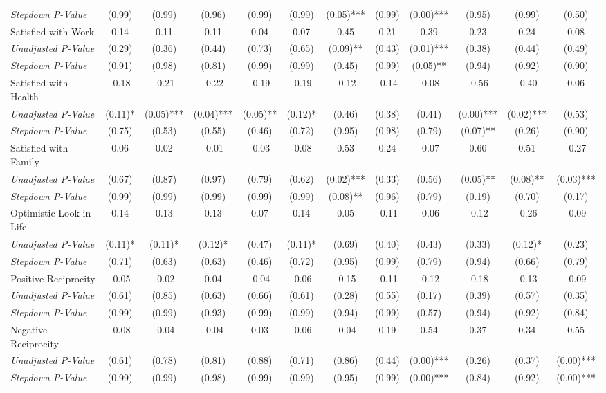 \begin{tabular}{l c c c c c c c c c c c}
\quad \textit{Stepdown P-Value} & (0.99) & (0.99) & (0.96) & (0.99) & (0.99) & (0.05)*** & (0.99) & (0.00)*** & (0.95) & (0.99) & (0.50) \\
Satisfied with Work & 0.14 & 0.11 & 0.11 & 0.04 & 0.07 & 0.45 & 0.21 & 0.39 & 0.23 & 0.24 & 0.08 \\
\quad \textit{Unadjusted P-Value} & (0.29) & (0.36) & (0.44) & (0.73) & (0.65) & (0.09)** & (0.43) & (0.01)*** & (0.38) & (0.44) & (0.49) \\
\quad \textit{Stepdown P-Value} & (0.91) & (0.98) & (0.81) & (0.99) & (0.99) & (0.45) & (0.99) & (0.05)** & (0.94) & (0.92) & (0.90) \\
Satisfied with Health & -0.18 & -0.21 & -0.22 & -0.19 & -0.19 & -0.12 & -0.14 & -0.08 & -0.56 & -0.40 & 0.06 \\
\quad \textit{Unadjusted P-Value} & (0.11)* & (0.05)*** & (0.04)*** & (0.05)** & (0.12)* & (0.46) & (0.38) & (0.41) & (0.00)*** & (0.02)*** & (0.53) \\
\quad \textit{Stepdown P-Value} & (0.75) & (0.53) & (0.55) & (0.46) & (0.72) & (0.95) & (0.98) & (0.79) & (0.07)** & (0.26) & (0.90) \\
Satisfied with Family & 0.06 & 0.02 & -0.01 & -0.03 & -0.08 & 0.53 & 0.24 & -0.07 & 0.60 & 0.51 & -0.27 \\
\quad \textit{Unadjusted P-Value} & (0.67) & (0.87) & (0.97) & (0.79) & (0.62) & (0.02)*** & (0.33) & (0.56) & (0.05)** & (0.08)** & (0.03)*** \\
\quad \textit{Stepdown P-Value} & (0.99) & (0.99) & (0.99) & (0.99) & (0.99) & (0.08)** & (0.96) & (0.79) & (0.19) & (0.70) & (0.17) \\
Optimistic Look in Life & 0.14 & 0.13 & 0.13 & 0.07 & 0.14 & 0.05 & -0.11 & -0.06 & -0.12 & -0.26 & -0.09 \\
\quad \textit{Unadjusted P-Value} & (0.11)* & (0.11)* & (0.12)* & (0.47) & (0.11)* & (0.69) & (0.40) & (0.43) & (0.33) & (0.12)* & (0.23) \\
\quad \textit{Stepdown P-Value} & (0.71) & (0.63) & (0.63) & (0.46) & (0.72) & (0.95) & (0.99) & (0.79) & (0.94) & (0.66) & (0.79) \\
Positive Reciprocity & -0.05 & -0.02 & 0.04 & -0.04 & -0.06 & -0.15 & -0.11 & -0.12 & -0.18 & -0.13 & -0.09 \\
\quad \textit{Unadjusted P-Value} & (0.61) & (0.85) & (0.63) & (0.66) & (0.61) & (0.28) & (0.55) & (0.17) & (0.39) & (0.57) & (0.35) \\
\quad \textit{Stepdown P-Value} & (0.99) & (0.99) & (0.93) & (0.99) & (0.99) & (0.94) & (0.99) & (0.57) & (0.94) & (0.92) & (0.84) \\
Negative Reciprocity & -0.08 & -0.04 & -0.04 & 0.03 & -0.06 & -0.04 & 0.19 & 0.54 & 0.37 & 0.34 & 0.55 \\
\quad \textit{Unadjusted P-Value} & (0.61) & (0.78) & (0.81) & (0.88) & (0.71) & (0.86) & (0.44) & (0.00)*** & (0.26) & (0.37) & (0.00)*** \\
\quad \textit{Stepdown P-Value} & (0.99) & (0.99) & (0.98) & (0.99) & (0.99) & (0.95) & (0.99) & (0.00)*** & (0.84) & (0.92) & (0.00)*** \\
\bottomrule
\end{tabular}
